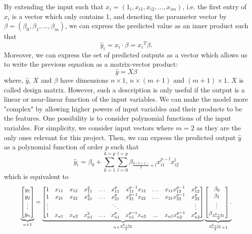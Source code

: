 By extending the input such that ${x}_i = (1_i, x_{i1}, x_{i2}, ..., x_{im})$, i.e. the first entry of $x_i$ is a vector which only contains 1, and denoting the parameter vector by ${\beta} = (\beta_0, \beta_1, ..., \beta_m)$, we can express the predicted value as an inner product such that   
\begin{equation*}
    \hat{y}_i = {x_i}\cdot {\beta} = {x_i}^T{\beta}.
\end{equation*}
Moreover, we can express the set of predicted outputs as a vector which allows us to write the previous equation as a matrix-vector product:
\begin{equation}
    \hat{y} = {X}{\beta} \label{eq:lin_reg_matrix_model}
\end{equation}
where, $\hat{y}$, ${X}$ and ${\beta}$ have dimensions $n \times 1$, $n \times (m+1)$ and $(m+1) \times 1$. $X$ is called design matrix. However, such a description is only useful if the output is a linear or near-linear function of the input variables.  We can make the model more "complex" by allowing higher powers of input variables and their products to be the features. One possibility is to consider polynomial functions of the input variables. For simplicity, we consider input vectors where $m=2$ as they are the only ones relevant for this project. Then, we can express the predicted output $\hat{y}$ as a polynomial function of order $p$ such that
\begin{equation}
    \hat{y}_i = \beta_0 + \sum_{k=1}^{k=p}\sum_{l=0}^{l=p}\beta_{\frac{k(k+1)}{2}+l}x_{i1}^{p-l}x_{i2}^{l}
\end{equation}
which is equivalent to
\begin{equation}
\resizebox{.9\hsize}{!}{$
    \underbrace{\begin{bmatrix}y_1 \\ y_2 \\ \vdots \\ y_n\end{bmatrix}}_{n \times 1} = \underbrace{\begin{bmatrix} 
    1 & x_{11} & x_{12} & x_{11}^2 & \dots & x_{11}^p & x_{11}^{p-1}x_{12} & \dots & x_{11}x_{12}^{p-1} & x_{12}^p 
    \\ 1 & x_{21} & x_{22} & x_{21}^2 & \dots & x_{21}^p & x_{21}^{p-1}x_{22} & \dots & x_{21}x_{22}^{p-1} & x_{22}^p 
    \\ \vdots &&&&& \ddots &&&&\vdots \\ 
    1 & x_{n1} & x_{n2} & x_{n1}^2 & \dots & x_{n1}^p & x_{n1}^{p-1}x_{n2} & ... & x_{n1}x_{n2}^{p-1} & x_{n2}^p
    \end{bmatrix}}_{n \times \frac{p^2+5p}{2}}\underbrace{\begin{bmatrix}\beta_0 \\ \beta_1 \\ \vdots \\ \beta_{\frac{p^2+3p}{2}}\end{bmatrix}.}_{\frac{p^2+5p}{2} \times 1}$}
\end{equation}
